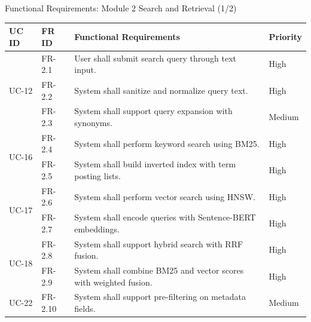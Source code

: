 \documentclass[aspectratio=169,xcolor=dvipsnames]{beamer}
\begin{document}
\begin{frame}{Functional Requirements: Module 2 Search and Retrieval (1/2)}
    \tiny
    \renewcommand{\arraystretch}{0.65}
    \begin{table}
        \centering
        \begin{tabular}{p{}|p{}|p{}|p{}}
        \toprule
        \textbf{UC ID} & \textbf{FR ID} & \textbf{Functional Requirements} & \textbf{Priority} \\
        \midrule
        \multirow{3}{*}{UC-12} & FR-2.1 & User shall submit search query through text input. & High \\
        & FR-2.2 & System shall sanitize and normalize query text. & High \\
        & FR-2.3 & System shall support query expansion with synonyms. & Medium \\
        \midrule
        \multirow{2}{*}{UC-16} & FR-2.4 & System shall perform keyword search using BM25. & High \\
        & FR-2.5 & System shall build inverted index with term posting lists. & High \\
        \midrule
        \multirow{2}{*}{UC-17} & FR-2.6 & System shall perform vector search using HNSW. & High \\
        & FR-2.7 & System shall encode queries with Sentence-BERT embeddings. & High \\
        \midrule
        \multirow{2}{*}{UC-18} & FR-2.8 & System shall support hybrid search with RRF fusion. & High \\
        & FR-2.9 & System shall combine BM25 and vector scores with weighted fusion. & High \\
        \midrule
        UC-22 & FR-2.10 & System shall support pre-filtering on metadata fields. & Medium \\
        \bottomrule
        \end{tabular}
    \end{table}
\end{frame}
\end{document}
